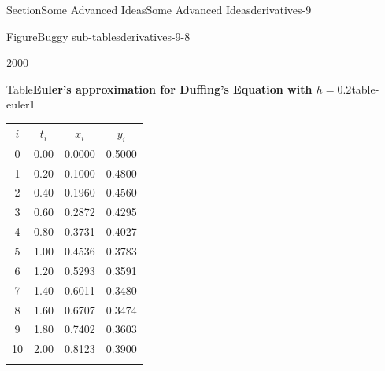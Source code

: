 \documentclass[twoside,10pt,]{article}
\newcommand{\tabularfont}{\relax}
\numberwithin{equation}{section}
\newcommand{\hrulethin}  {\noalign{\hrule height 0.04em}}
\newcommand{\hrulemedium}{\noalign{\hrule height 0.07em}}
\newcommand{\hrulethick} {\noalign{\hrule height 0.11em}}
\begin{document}
\begin{sectionptx}{Section}{Some Advanced Ideas}{}{Some Advanced Ideas}{}{}{derivatives-9}
\begin{figureptx}{Figure}{Buggy sub-tables}{derivatives-9-8}{}
\begin{sidebyside}{2}{0}{0}{0}
\end{sidebyside}%
\tcblower
\end{figureptx}%
\begin{tableptx}{Table}{\textbf{Euler's approximation for Duffing's Equation with \(h = 0.2\)}}{table-euler1}{}%
\centering%
{\tabularfont%
\begin{tabular}{cccc}\hrulethick
\(i\)&\(t_i\)&\(x_i\)&\(y_i\)\tabularnewline\hrulethin
0&0.00&0.0000&0.5000\tabularnewline[0pt]
1&0.20&0.1000&0.4800\tabularnewline[0pt]
2&0.40&0.1960&0.4560\tabularnewline[0pt]
3&0.60&0.2872&0.4295\tabularnewline[0pt]
4&0.80&0.3731&0.4027\tabularnewline[0pt]
5&1.00&0.4536&0.3783\tabularnewline[0pt]
6&1.20&0.5293&0.3591\tabularnewline[0pt]
7&1.40&0.6011&0.3480\tabularnewline[0pt]
8&1.60&0.6707&0.3474\tabularnewline[0pt]
9&1.80&0.7402&0.3603\tabularnewline[0pt]
10&2.00&0.8123&0.3900\tabularnewline\hrulemedium
\end{tabular}
}%
\end{tableptx}%
\end{sectionptx}
%
%
\typeout{************************************************}
\typeout{************************************************}
%
\end{document}
